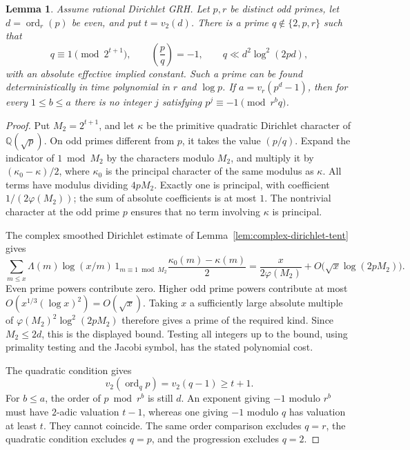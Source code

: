 \documentclass[11pt]{article}
\newtheorem{lemma}[theorem]{Lemma}
\theoremstyle{definition}
\theoremstyle{remark}
\begin{document}
\begin{lemma}\label{lem:quadratic-cm-auxiliary}
Assume rational Dirichlet GRH. Let \(p,r\) be distinct odd primes,
let \(d=\operatorname{ord}_r(p)\) be even, and put \(t=v_2(d)\).
There is a prime \(q\notin\{2,p,r\}\) such that
\[
 q\equiv1\pmod{2^{t+1}},\qquad
 \left(\frac pq\right)=-1,\qquad
 q\ll d^2\log^2(2pd),
\]
with an absolute effective implied constant. Such a prime can be
found deterministically in time polynomial in \(r\) and \(\log p\).
If \(a=v_r(p^d-1)\), then for every \(1\leq b\leq a\) there is
no integer \(j\) satisfying \(p^j\equiv-1\pmod{r^bq}\).
\end{lemma}
\begin{proof}
Put \(M_2=2^{t+1}\), and let \(\kappa\) be the primitive quadratic
Dirichlet character of \(\mathbb Q(\sqrt p)\). On odd primes
different from \(p\), it takes the value \((p/q)\).
Expand the indicator of \(1\bmod M_2\) by the characters modulo
\(M_2\), and multiply it by
\((\kappa_0-\kappa)/2\), where \(\kappa_0\) is the principal
character of the same modulus as \(\kappa\).
All terms have modulus dividing \(4pM_2\).
Exactly one is principal, with coefficient
\(1/(2\varphi(M_2))\); the sum of absolute coefficients is at most
\(1\). The nontrivial character at the odd prime \(p\) ensures
that no term involving \(\kappa\) is principal.

The complex smoothed Dirichlet estimate of
Lemma~\ref{lem:complex-dirichlet-tent} gives
\[
 \sum_{m\leq x}\Lambda(m)\log(x/m)\,
 1_{m\equiv1\bmod M_2}
 \frac{\kappa_0(m)-\kappa(m)}2
 =
 \frac{x}{2\varphi(M_2)}
 +O\bigl(\sqrt x\log(2pM_2)\bigr).
\]
Even prime powers contribute zero. Higher odd prime powers
contribute at most
\(O(x^{1/3}(\log x)^2)=O(\sqrt x)\).
Taking \(x\) a sufficiently large absolute multiple of
\(\varphi(M_2)^2\log^2(2pM_2)\) therefore gives a prime of the
required kind. Since \(M_2\leq2d\), this is the displayed bound.
Testing all integers up to the bound, using primality testing and
the Jacobi symbol, has the stated polynomial cost.

The quadratic condition gives
\[
 v_2(\operatorname{ord}_q p)=v_2(q-1)\geq t+1.
\]
For \(b\leq a\), the order of \(p\bmod r^b\) is still \(d\).
An exponent giving \(-1\) modulo \(r^b\) must have
\(2\)-adic valuation \(t-1\), whereas one giving \(-1\) modulo
\(q\) has valuation at least \(t\). They cannot coincide.
The same order comparison excludes \(q=r\), the quadratic
condition excludes \(q=p\), and the progression excludes \(q=2\).
\end{proof}
\end{document}
